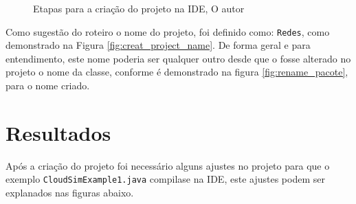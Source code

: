 \begin{figure}[H]
    \center
    \caption{Etapas para a criação do projeto na IDE, O autor}\label{fig:confi_project}
\end{figure}
\par Como sugestão do roteiro o nome do projeto, foi definido como: \verb#Redes#, como demonstrado na Figura \ref{fig:creat_project_name}. De forma geral e para entendimento, este nome poderia ser qualquer outro desde que o fosse alterado no projeto o nome da classe, conforme é demonstrado na figura \ref{fig:rename_pacote}, para o nome criado.



\section{Resultados}
\par Após a criação do projeto foi necessário alguns ajustes no projeto para que o exemplo \verb#CloudSimExample1.java# compilase na IDE, este ajustes podem ser explanados nas figuras abaixo.

